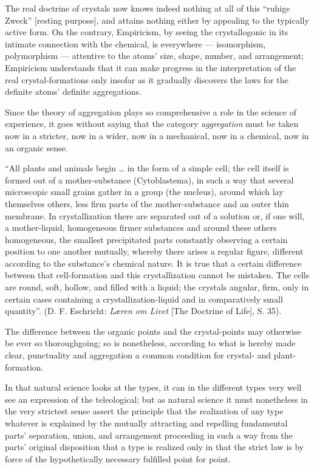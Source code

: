 \documentclass[12pt]{book}
\begin{document}
The real doctrine of crystals now knows indeed nothing at all of this ``ruhige Zweck'' [resting
purpose], and attains nothing either by appealing to the typically active form. On the contrary,
Empiricism, by seeing the crystallogonic in its intimate connection with the chemical, is everywhere ---
isomorphism, polymorphism --- attentive to the atoms' size, shape,
number, and arrangement; Empiricism understands that it can make progress in the interpretation of the
real crystal-formations only insofar as it gradually discovers the laws for the definite atoms' definite
aggregations.

Since the theory of aggregation plays so comprehensive a role in the science of experience, it goes
without saying that the category \emph{aggregation} must be taken now in a stricter, now in a wider, now
in a mechanical, now in a chemical, now in an organic sense.

``All plants and animals begin \ldots{} in the form of a simple cell; the cell itself is formed out of a
mother-substance (Cytoblastema), in such a way that several microscopic small grains gather in a group
(the nucleus), around which lay themselves others, less firm parts of the mother-substance and an outer
thin membrane. In crystallization there are separated out of a solution or, if one will, a
mother-liquid, homogeneous firmer substances and around these others homogeneous, the smallest
precipitated parts constantly observing a certain position to one another mutually, whereby there arises
a regular figure, different according to the substance's chemical nature. It is true that a certain
difference between that cell-formation and this crystallization cannot be mistaken. The cells are round,
soft, hollow, and filled with a liquid; the crystals angular, firm, only in certain cases containing a
crystallization-liquid and in comparatively small quantity''. (D. F. Eschricht: \emph{Læren om Livet}
[The Doctrine of Life], S. 35).

The difference between the organic points and the crystal-points may otherwise be ever so thoroughgoing;
so is nonetheless, according to what is hereby made clear, punctuality and aggregation a common
condition for crystal- and plant-formation.

In that natural science looks at the types, it can in the different types very well see an expression of
the teleological; but as natural science it must nonetheless in the very strictest sense assert the
principle that the realization of any type whatever is explained by the mutually attracting
and repelling fundamental parts' separation, union, and arrangement proceeding in such a way from the
parts' original disposition that a type is realized only in that the strict law is by force of the
hypothetically necessary fulfilled point for point.
\end{document}
